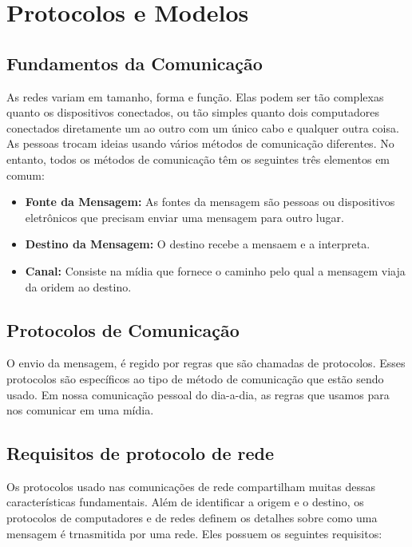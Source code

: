 \documentclass[12pt a4paper]{paper}
\begin{document}
 
\section{Protocolos e Modelos} %
\label{sec:Protocolos e Modelos}
\subsection{Fundamentos da Comunicação} %
\label{sub:Fundamentos da Comunicação}
As redes variam em tamanho, forma e função. Elas podem ser tão complexas quanto os 
dispositivos conectados, ou tão simples quanto dois computadores conectados diretamente
um ao outro com um único cabo e qualquer outra coisa.
As pessoas trocam ideias usando vários métodos de comunicação diferentes. No entanto, 
todos os métodos de comunicação têm os seguintes três elementos em comum:

\begin{itemize}
  \item \textbf{Fonte da Mensagem: } As fontes da mensagem são pessoas ou dispositivos eletrônicos que precisam enviar uma mensagem para outro lugar.
  \item \textbf{Destino da Mensagem: }O destino recebe a mensaem e a interpreta.
  \item \textbf{Canal: }Consiste na mídia que fornece o caminho pelo qual a mensagem viaja da oridem ao destino.
\end{itemize}

\subsection{Protocolos de Comunicação} %
\label{sub:Protocolos de Comunicação}
O envio da mensagem, é regido por regras que são chamadas de protocolos. 
Esses protocolos são específicos ao tipo de método de comunicação que estão sendo usado.
Em nossa comunicação pessoal do dia-a-dia, as regras que usamos para nos comunicar 
em uma mídia.

\subsection{Requisitos de protocolo de rede} %
\label{sub:Requisitos de protocolo de rede}
Os protocolos usado nas comunicações de rede compartilham muitas dessas características
fundamentais. Além de identificar a origem e o destino, os protocolos de computadores e 
de redes definem os detalhes sobre como uma mensagem é trnasmitida por uma rede. 
Eles possuem os seguintes requisitos:
\end{document}
